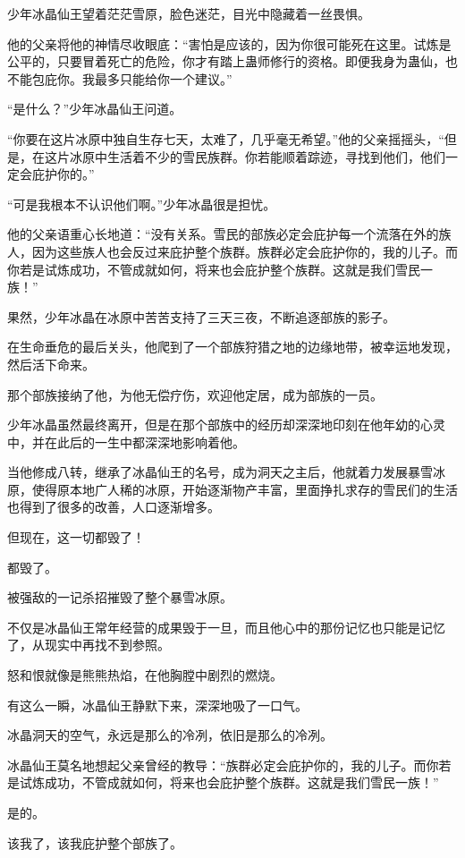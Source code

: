 \begin{this_body}
少年冰晶仙王望着茫茫雪原，脸色迷茫，目光中隐藏着一丝畏惧。

他的父亲将他的神情尽收眼底：“害怕是应该的，因为你很可能死在这里。试炼是公平的，只要冒着死亡的危险，你才有踏上蛊师修行的资格。即便我身为蛊仙，也不能包庇你。我最多只能给你一个建议。”

“是什么？”少年冰晶仙王问道。

“你要在这片冰原中独自生存七天，太难了，几乎毫无希望。”他的父亲摇摇头，“但是，在这片冰原中生活着不少的雪民族群。你若能顺着踪迹，寻找到他们，他们一定会庇护你的。”

“可是我根本不认识他们啊。”少年冰晶很是担忧。

他的父亲语重心长地道：“没有关系。雪民的部族必定会庇护每一个流落在外的族人，因为这些族人也会反过来庇护整个族群。族群必定会庇护你的，我的儿子。而你若是试炼成功，不管成就如何，将来也会庇护整个族群。这就是我们雪民一族！”

果然，少年冰晶在冰原中苦苦支持了三天三夜，不断追逐部族的影子。

在生命垂危的最后关头，他爬到了一个部族狩猎之地的边缘地带，被幸运地发现，然后活下命来。

那个部族接纳了他，为他无偿疗伤，欢迎他定居，成为部族的一员。

少年冰晶虽然最终离开，但是在那个部族中的经历却深深地印刻在他年幼的心灵中，并在此后的一生中都深深地影响着他。

当他修成八转，继承了冰晶仙王的名号，成为洞天之主后，他就着力发展暴雪冰原，使得原本地广人稀的冰原，开始逐渐物产丰富，里面挣扎求存的雪民们的生活也得到了很多的改善，人口逐渐增多。

但现在，这一切都毁了！

都毁了。

被强敌的一记杀招摧毁了整个暴雪冰原。

不仅是冰晶仙王常年经营的成果毁于一旦，而且他心中的那份记忆也只能是记忆了，从现实中再找不到参照。

怒和恨就像是熊熊热焰，在他胸膛中剧烈的燃烧。

有这么一瞬，冰晶仙王静默下来，深深地吸了一口气。

冰晶洞天的空气，永远是那么的冷冽，依旧是那么的冷冽。

冰晶仙王莫名地想起父亲曾经的教导：“族群必定会庇护你的，我的儿子。而你若是试炼成功，不管成就如何，将来也会庇护整个族群。这就是我们雪民一族！”

是的。

该我了，该我庇护整个部族了。


\end{this_body}
